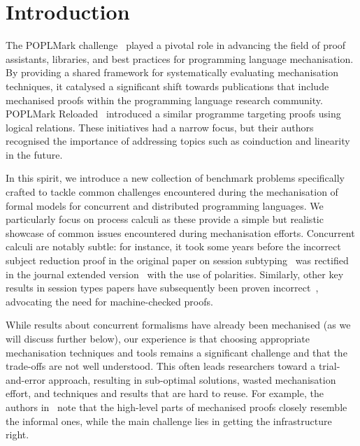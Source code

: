 \documentclass[runningheads]{llncs}
\begin{document}
\section{Introduction}
The POPLMark challenge~\cite{POPLMark}
played a pivotal role in advancing the field of proof assistants,
libraries, and best practices for programming language
mechanisation. By providing a shared framework for systematically
evaluating mechanisation techniques, it catalysed a significant
shift towards publications that include mechanised proofs within the programming language research community.
POPLMark Reloaded~\cite{POPLMarkReloaded} introduced a similar programme targeting proofs using logical relations.
These initiatives had a narrow focus, but their authors recognised the importance of addressing topics such as coinduction and linearity in the future.

In this spirit, we introduce a new collection of benchmark problems
specifically crafted to tackle common challenges encountered during
the mechanisation of formal models for concurrent and distributed
programming languages.  We particularly focus on process calculi as
these provide a simple but realistic showcase of common issues
encountered during mechanisation efforts.  Concurrent calculi are
notably subtle: for instance, it took some years before the incorrect
subject reduction proof in the original paper on session
subtyping~\cite{GH99} was rectified in the journal extended
version~\cite{GH05} with the use of polarities. %
Similarly, other key results in session types papers have subsequently
been proven incorrect~\cite{Gay2020,10.1145/3290343}, advocating the
need for machine-checked proofs.

While results about concurrent
formalisms have already been mechanised (as we will discuss further
below), our experience is that choosing appropriate mechanisation
techniques and tools remains a significant challenge and that the
trade-offs are not well understood.  This often leads researchers
toward a trial-and-error approach, resulting in sub-optimal solutions,
wasted mechanisation effort, and techniques and results that are hard
to reuse. For example, the authors in~\cite{Cruz-Filipe2021b} note that the high-level parts of
mechanised proofs closely resemble the informal ones, while the
main challenge lies in getting the infrastructure right.
\end{document}
